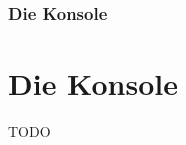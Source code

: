 
\begin{frame}

    \frametitle{Die Konsole}
    \section{Die Konsole}\label{sec:die-konsole}

    TODO


\end{frame}